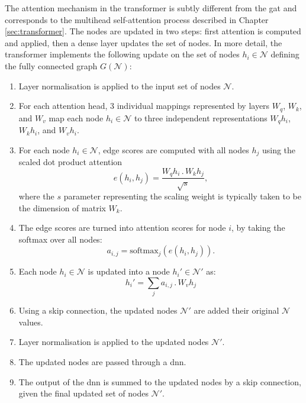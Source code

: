The attention mechanism in the transformer is subtly different from the \gls{gat} and corresponds to the multihead self-attention process described in Chapter \ref{sec:transformer}. The nodes are updated in two steps: first attention is computed and applied, then a dense layer updates the set of nodes. In more detail, the transformer implements the following update on the set of nodes $h_i \in \mathcal{N}$ defining the fully connected graph $G(\mathcal{N})$:
\begin{enumerate}
  \item Layer normalisation is applied to the input set of nodes $\mathcal{N}$.
  \item For each attention head, 3 individual mappings represented by layers $W_q$, $W_k$, and $W_v$ map each node $h_i \in \mathcal{N}$ to three independent representations $W_qh_i$, $W_kh_i$, and $W_vh_i$.
  \item For each node $h_i \in \mathcal{N}$, edge scores are computed with all nodes $h_j$ using the scaled dot product attention \[e\left(h_i, h_j\right) = \frac{W_q h_i\, . \, W_k h_j}{\sqrt{s}},\] where the $s$ parameter representing the scaling weight is typically taken to be the dimension of matrix $W_k$. 
  \item The edge scores are turned into attention scores for node $i$, by taking the softmax over all nodes: \[a_{i, j} = \textrm{softmax}_j\left(e(h_i, h_j) \right).\]
  \item Each node $h_i \in \mathcal{N}$ is updated into a node $h_i' \in \mathcal{N}'$ as: \[h_i' = \sum_j a_{i, j} \,.\, W_v h_j\]
  \item Using a skip connection, the updated nodes $\mathcal{N}'$ are added their original $\mathcal{N}$ values. 
  \item Layer normalisation is applied to the updated nodes $\mathcal{N}'$.
  \item The updated nodes are passed through a \gls{dnn}.
  \item The output of the \gls{dnn} is summed to the updated nodes by a skip connection, given the final updated set of nodes $\mathcal{N}'$.
\end{enumerate}

